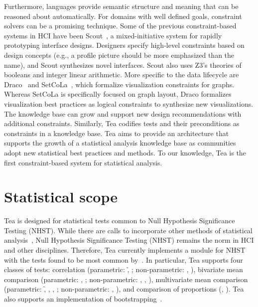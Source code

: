 Furthermore, languages provide semantic structure and meaning that can be
reasoned about automatically. For domains with well defined goals, constraint
solvers can be a promising technique. Some of the previous constraint-based
systems in HCI have been Scout~\cite{swearngin2018scout}, a mixed-initiative
system for rapidly prototyping interface designs. Designers specify high-level
constraints based on design concepts (e.g., a profile picture should be more
emphasized than the name), and Scout synthesizes novel interfaces. Scout also
uses Z3's theories of booleans and integer linear arithmetic. More specific to
the data lifecycle are Draco~\cite{moritz2019formalizing} and
SetCoLa~\cite{hoffswell2018setcola}, which formalize visualization constraints
for graphs. Whereas SetCoLa is specifically focused on graph layout, Draco
formalizes visualization best practices as logical constraints to synthesize new
visualizations. The knowledge base can grow and support new design
recommendations with additional constraints. Similarly, Tea codifies tests and
their preconditions as constraints in a knowledge base. Tea aims to provide an
architecture that supports the growth of a statistical analysis knowledge base
as communities adopt new statistical best practices and methods. To our
knowledge, Tea is the first constraint-based system for statistical analysis. 


\section*{Statistical scope}
Tea is designed for statistical tests common to Null Hypothesis Significance
Testing (NHST). While there are calls to incorporate other methods of
statistical analysis~\cite{kay2016researcher,kaptein2012rethinking}, Null
Hypothesis Significance Testing (NHST) remains the norm in HCI and other
disciplines. Therefore, Tea currently implements a module for NHST with the
tests found to be most common by~\cite{wacharamanotham2015statsplorer}. In
particular, Tea supports four classes of tests: correlation (parametric: \r,
\pb; non-parametric: \ktau, \srho), bivariate mean comparison (parametric:
\student, \paired; non-parametric: \mannu, \wilcox, \welch), multivariate mean
comparison (parametric: \f, \rm, \facANOVA, \twoANOVA; non-parametric: \kw,
\friedman), and comparison of proportions (\chiSq, \fisher). Tea also supports
an implementation of bootstrapping~\cite{efron1992bootstrap}.